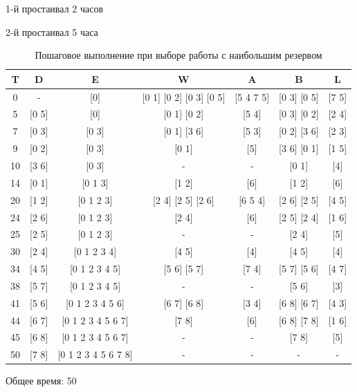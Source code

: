\documentclass[a4paper,14pt]{extarticle}
\begin{document}
1-й простаивал 2 часов

2-й простаивал 5 часа

\begin{table}[H]
\caption{Пошаговое выполнение при выборе работы с наибольшим резервом}
\label{tabular:timesandtenses}
\begin{center}
\begin{tabular}{|c|c|c|c|c|c|c|}
\hline
T & D & E & W & A & B & L\\ \hline
0 & - & [0] & [0 1]
 [0 2]
 [0 3]
 [0 5] & [5 4 7 5] & [0 3]
 [0 5] & [7 5] \\ \hline 
 5 & [0 5] & [0] & [0 1]
 [0 2] & [5 4] & [0 3]
 [0 2] & [2 4] \\ \hline 
 7 & [0 3] & [0 3] & [0 1]
 [3 6] & [5 3] & [0 2]
 [3 6] & [2 3] \\ \hline 
 9 & [0 2] & [0 3] & [0 1] & [5] & [3 6]
 [0 1] & [1 5] \\ \hline 
 10 & [3 6] & [0 3] & - & - & [0 1] & [4] \\ \hline 
 14 & [0 1] & [0 1 3] & [1 2] & [6] & [1 2] & [6] \\ \hline 
 20 & [1 2] & [0 1 2 3] & [2 4]
 [2 5]
 [2 6] & [6 5 4] & [2 6]
 [2 5] & [4 5] \\ \hline 
 24 & [2 6] & [0 1 2 3] & [2 4] & [6] & [2 5]
 [2 4] & [1 6] \\ \hline 
 25 & [2 5] & [0 1 2 3] & - & - & [2 4] & [5] \\ \hline 
 30 & [2 4] & [0 1 2 3 4] & [4 5] & [4] & [4 5] & [4] \\ \hline 
 34 & [4 5] & [0 1 2 3 4 5] & [5 6]
 [5 7] & [7 4] & [5 7]
 [5 6] & [4 7] \\ \hline 
 38 & [5 7] & [0 1 2 3 4 5] & - & - & [5 6] & [3] \\ \hline 
 41 & [5 6] & [0 1 2 3 4 5 6] & [6 7]
 [6 8] & [3 4] & [6 8]
 [6 7] & [4 3] \\ \hline 
 44 & [6 7] & [0 1 2 3 4 5 6 7] & [7 8] & [6] & [6 8]
 [7 8] & [1 6] \\ \hline 
 45 & [6 8] & [0 1 2 3 4 5 6 7] & - & - & [7 8] & [5] \\ \hline 
 50 & [7 8] & [0 1 2 3 4 5 6 7 8] & - & - & - & - \\ \hline 
\end{tabular}
\end{center}
\end{table}

Общее время: 50\\\\
\end{document}
